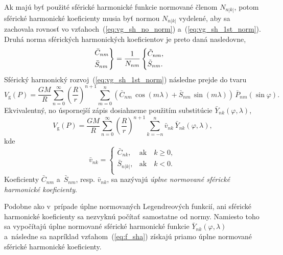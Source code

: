 \documentclass[a4paper,12pt]{book}
\newcommand{\gidx}{\mathrm g}
\begin{document}
Ak majú byť použité sférické harmonické funkcie normované členom $N_{n|k|}$,
potom sférické harmonické koeficienty musia byť normou $N_{n|k|}$ vydelené, aby
sa zachovala rovnosť vo vzťahoch~(\ref{eq:vg_sh_no_norm})
a~(\ref{eq:vg_sh_1st_norm}).  Druhá norma sférických harmonických koeficientov
je preto daná nasledovne,
%
\begin{equation}
\begin{rcases}
\bar{C}_{nm}\\
\bar{S}_{nm}
\end{rcases}
= \frac{1}{N_{nm}}
\begin{cases}
\tilde{C}_{nm}{,}\\
\tilde{S}_{nm}{.}
\end{cases}
\end{equation}
%
Sférický harmonický rozvoj~(\ref{eq:vg_sh_1st_norm}) následne prejde do tvaru
%
\begin{equation}
\label{eq:vg_sh_2nd_norm}
V_\gidx(P) = \frac{GM}{R} \sum_{n = 0}^\infty \left( \frac{R}{r} \right)^{n
+ 1} \sum_{m = 0}^{n} \left( \bar{C}_{nm} \, \cos(m\lambda) + \bar{S}_{nm} \,
\sin(m\lambda)\right) \, \bar{P}_{nm}(\sin\varphi){.}
\end{equation}
%
Ekvivalentný, no úspornejší zápis dosiahneme použitím substitúcie
$\bar{Y}_{nk}(\varphi, \lambda)$,
%
\begin{equation}
\label{eq:vg_sh_2nd_norm_ynk}
V_\gidx(P) = \frac{GM}{R} \sum_{n = 0}^\infty \left( \frac{R}{r} \right)^{n
+ 1} \sum_{k = -n}^{n} \bar{v}_{nk} \, \bar{Y}_{nk}(\varphi, \lambda){,}
\end{equation}
kde
%
\begin{equation}
\bar{v}_{nk} =
%
\begin{cases}
\bar{C}_{nk}{,}    &\text{ak} \quad k \geq 0{,}\\
\bar{S}_{n|k|}{,}  &\text{ak} \quad k < 0{.}\\
\end{cases}
\end{equation}
%
Koeficienty $\bar{C}_{nm}$ a~$\bar{S}_{nm}$, resp. $\bar{v}_{nk}$, sa nazývajú
\emph{úplne normované sférické harmonické koeficienty}.

Podobne ako v~prípade úplne normovaných Legendreových funkcií, ani sférické
harmonické koeficienty sa nezvyknú počítať samostatne od normy.  Namiesto toho
sa vypočítajú úplne normované sférické harmonické funkcie
$\bar{Y}_{nk}(\varphi, \lambda)$ a~následne sa napríklad
vzťahom~(\ref{eq:f_sha}) získajú priamo úplne normované sférické harmonické
koeficienty.
\end{document}

